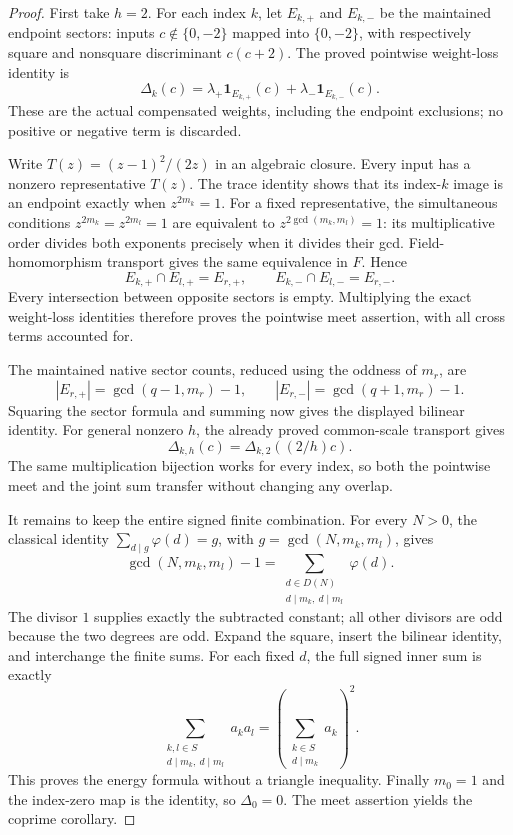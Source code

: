 \documentclass[11pt]{article}
\begin{document}
\begin{proof}
First take \(h=2\). For each index \(k\), let \(E_{k,+}\)
and \(E_{k,-}\) be the maintained endpoint sectors: inputs
\(c\notin\{0,-2\}\) mapped into \(\{0,-2\}\), with respectively
square and nonsquare discriminant \(c(c+2)\).
The proved pointwise weight-loss identity is
\[
 \Delta_k(c)=
 \lambda_+\mathbf1_{E_{k,+}}(c)+
 \lambda_-\mathbf1_{E_{k,-}}(c).
\]
These are the actual compensated weights, including the endpoint
exclusions; no positive or negative term is discarded.

Write \(T(z)=(z-1)^2/(2z)\) in an algebraic closure.
Every input has a nonzero representative \(T(z)\).
The trace identity shows that its index-\(k\) image is an endpoint
exactly when \(z^{2m_k}=1\).
For a fixed representative, the simultaneous conditions
\(z^{2m_k}=z^{2m_l}=1\) are equivalent to
\(z^{2\gcd(m_k,m_l)}=1\): its multiplicative order divides
both exponents precisely when it divides their gcd.
Field-homomorphism transport gives the same equivalence in \(F\).
Hence
\[
 E_{k,+}\cap E_{l,+}=E_{r,+},\qquad
 E_{k,-}\cap E_{l,-}=E_{r,-}.
\]
Every intersection between opposite sectors is empty.
Multiplying the exact weight-loss identities therefore proves the
pointwise meet assertion, with all cross terms accounted for.

The maintained native sector counts, reduced using the oddness
of \(m_r\), are
\[
 |E_{r,+}|=\gcd(q-1,m_r)-1,\qquad
 |E_{r,-}|=\gcd(q+1,m_r)-1.
\]
Squaring the sector formula and summing now gives the displayed
bilinear identity. For general nonzero \(h\), the already proved
common-scale transport gives
\[
 \Delta_{k,h}(c)=\Delta_{k,2}((2/h)c).
\]
The same multiplication bijection works for every index, so both
the pointwise meet and the joint sum transfer without changing
any overlap.

It remains to keep the entire signed finite combination.
For every \(N>0\), the classical identity
\(\sum_{d\mid g}\varphi(d)=g\), with
\(g=\gcd(N,m_k,m_l)\), gives
\[
 \gcd(N,m_k,m_l)-1
 =\sum_{\substack{d\in D(N)\\d\mid m_k,\ d\mid m_l}}\varphi(d).
\]
The divisor \(1\) supplies exactly the subtracted constant;
all other divisors are odd because the two degrees are odd.
Expand the square, insert the bilinear identity, and interchange
the finite sums. For each fixed \(d\), the full signed inner sum
is exactly
\[
 \sum_{\substack{k,l\in S\\d\mid m_k,\ d\mid m_l}}a_k a_l
       =\left(\sum_{\substack{k\in S\\d\mid m_k}}a_k\right)^2.
\]
This proves the energy formula without a triangle inequality.
Finally \(m_0=1\) and the index-zero map is the identity, so
\(\Delta_0=0\). The meet assertion yields the coprime corollary.
\end{proof}
\end{document}
